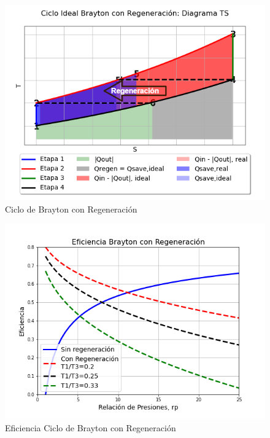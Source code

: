             \begin{multicols}{2}
                \begin{figure}
                    \includegraphics[width=\textwidth]{img/ciclos/ciclo_brayton_reg.png}
                    \caption{Ciclo de Brayton con Regeneración}
                    \label{fig:ciclo_brayton_reg}
                \end{figure}
                
                \begin{figure}
                    \includegraphics[width=\textwidth]{img/graficos/ef_brayton_reg.png}
                    \caption{Eficiencia Ciclo de Brayton con Regeneración}
                    \label{fig:ef_brayton_reg}
                \end{figure}
                
            \end{multicols}
                
